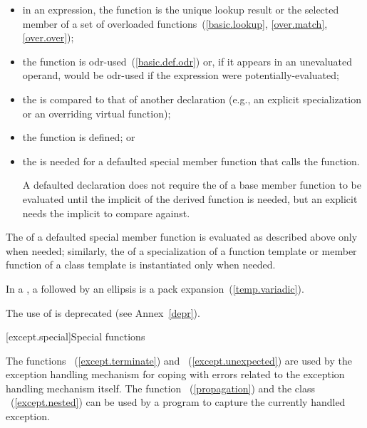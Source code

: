 \begin{itemize}
\item in an expression, the function is the unique lookup result or the selected
member of a set of overloaded functions~(\ref{basic.lookup}, \ref{over.match}, \ref{over.over});

\item the function is odr-used~(\ref{basic.def.odr}) or, if it appears in an
unevaluated operand, would be odr-used if the expression were
potentially-evaluated;

\item the  is compared to that of another
declaration (e.g., an explicit specialization or an overriding virtual
function);

\item the function is defined; or

\item the  is needed for a defaulted
special member function that calls the function.
\begin{note} A defaulted declaration does not require the
 of a base member function to be evaluated
until the implicit  of the derived
function is needed, but an explicit  needs
the implicit  to compare against.
\end{note}
\end{itemize}

The  of a defaulted special member
function is evaluated as described above only when needed; similarly, the
 of a specialization of a function
template or member function of a class template is instantiated only when
needed.



\pnum
In a , a
 followed by an ellipsis is a
pack expansion~(\ref{temp.variadic}).

\pnum
\begin{note} The use of  is deprecated
(see Annex~\ref{depr}). \end{note}%

[except.special]{Special functions}

\pnum
The functions ~(\ref{except.terminate}) and
~(\ref{except.unexpected}) are used by the exception
handling mechanism for coping with errors related to the exception handling
mechanism itself. The function
~(\ref{propagation}) and the class
~(\ref{except.nested}) can be used by a program to
capture the currently handled exception.

